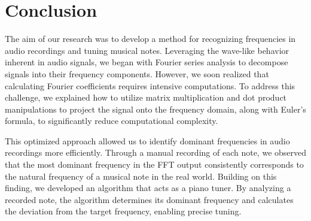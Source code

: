 \documentclass{article}
\begin{document}
\section*{Conclusion}
The aim of our research was to develop a method for recognizing frequencies in audio recordings and tuning musical notes. Leveraging the wave-like behavior inherent in audio signals, we began with Fourier series analysis to decompose signals into their frequency components. However, we soon realized that calculating Fourier coefficients requires intensive computations. To address this challenge, we explained how to utilize matrix multiplication and dot product manipulations to project the signal onto the frequency domain, along with Euler's formula, to significantly reduce computational complexity.

This optimized approach allowed us to identify dominant frequencies in audio recordings more efficiently. Through a manual recording of each note, we observed that the most dominant frequency in the FFT output consistently corresponds to the natural frequency of a musical note in the real world. Building on this finding, we developed an algorithm that acts as a piano tuner. By analyzing a recorded note, the algorithm determines its dominant frequency and calculates the deviation from the target frequency, enabling precise tuning.
\end{document}
